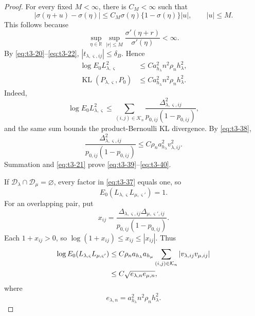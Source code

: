 \documentclass[11pt]{article}
\theoremstyle{definition}
\newcommand{\1}{\mathbf 1}\newcommand{\op}{\operatorname}
\begin{document}
\begin{proof}
For every fixed \(M<\infty\), there is \(C_M<\infty\) such that
\begin{equation}
|\sigma(\eta+u)-\sigma(\eta)|
\le
C_M\sigma(\eta)\{1-\sigma(\eta)\}|u|,
\qquad |u|\le M.
\label{eq:t3-38}
\end{equation}
This follows because
\[
\sup_{\eta\in\mathbb R}
\sup_{|r|\le M}
\frac{\sigma'(\eta+r)}{\sigma'(\eta)}
<\infty.
\]
By \eqref{eq:t3-20}--\eqref{eq:t3-22},
\(|t_{\lambda,\varsigma,ij}|\le\delta_B\).  Hence
\begin{align}
\log E_0L_{\lambda,\varsigma}^2
&\le
C a_{h_\lambda}^2n^2\rho_nh_\lambda^2,
\label{eq:t3-39}\\
\operatorname{KL}(P_{\lambda,\varsigma},P_0)
&\le
C a_{h_\lambda}^2n^2\rho_nh_\lambda^2.
\label{eq:t3-40}
\end{align}
Indeed,
\[
\log E_0L_{\lambda,\varsigma}^2
\le
\sum_{(i,j)\in\mathcal K_n}
\frac{\Delta_{\lambda,\varsigma,ij}^2}
{p_{0,ij}(1-p_{0,ij})},
\]
and the same sum bounds the product-Bernoulli KL divergence.  By
\eqref{eq:t3-38},
\[
\frac{\Delta_{\lambda,\varsigma,ij}^2}
{p_{0,ij}(1-p_{0,ij})}
\le
C\rho_n a_{h_\lambda}^2v_{\lambda,ij}^2.
\]
Summation and \eqref{eq:t3-21} prove
\eqref{eq:t3-39}--\eqref{eq:t3-40}.

If
\(\mathcal D_\lambda\cap\mathcal D_\mu=\varnothing\), every factor in
\eqref{eq:t3-37} equals one, so
\begin{equation}
E_0
(L_{\lambda,\varsigma}L_{\mu,\varsigma'})
=1.
\label{eq:t3-41}
\end{equation}
For an overlapping pair, put
\[
x_{ij}
=
\frac{
\Delta_{\lambda,\varsigma,ij}
\Delta_{\mu,\varsigma',ij}
}{
p_{0,ij}(1-p_{0,ij})
}.
\]
Each \(1+x_{ij}>0\), so
\(\log(1+x_{ij})\le x_{ij}\le|x_{ij}|\).  Thus
\begin{align}
\log E_0
(L_{\lambda,\varsigma}L_{\mu,\varsigma'})
&\le
C\rho_n a_{h_\lambda}a_{h_\mu}
\sum_{(i,j)\in\mathcal K_n}
|v_{\lambda,ij}v_{\mu,ij}|
\notag\\
&\le
C\sqrt{e_{\lambda,n}e_{\mu,n}},
\label{eq:t3-42}
\end{align}
where
\[
e_{\lambda,n}
=
a_{h_\lambda}^2n^2\rho_nh_\lambda^2.
\]


\end{proof}
\end{document}

